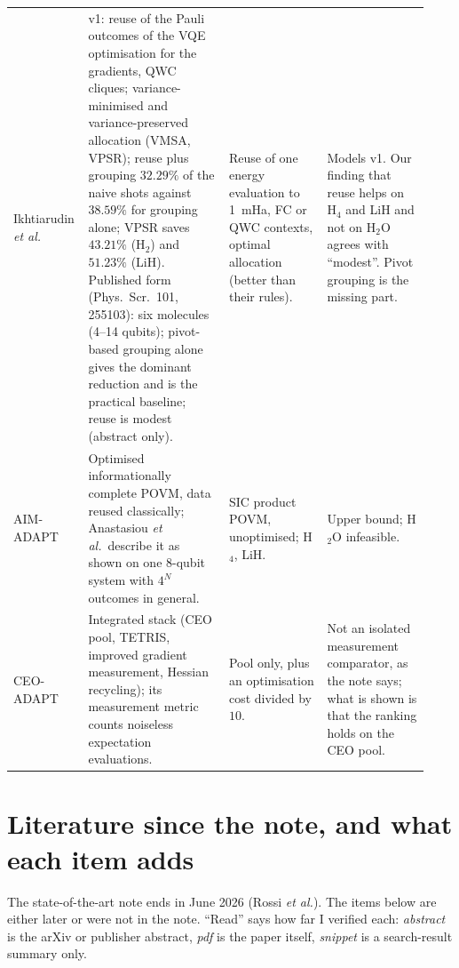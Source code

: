 \documentclass[11pt]{article}
\newcommand{\Hfour}{H$_4$}
\newcommand{\Htwo}{H$_2$O}
\begin{document}
\begin{longtable}{>{\raggedright\arraybackslash}p{0.13\linewidth}>{\raggedright\arraybackslash}p{0.33\linewidth}>{\raggedright\arraybackslash}p{0.23\linewidth}>{\raggedright\arraybackslash}p{0.24\linewidth}}
Ikhtiarudin \emph{et al.} & v1: reuse of the Pauli outcomes of the VQE optimisation for the gradients, QWC cliques; variance-minimised and variance-preserved allocation (VMSA, VPSR); reuse plus grouping $32.29\%$ of the naive shots against $38.59\%$ for grouping alone; VPSR saves $43.21\%$ (H$_2$) and $51.23\%$ (LiH). Published form (Phys.\ Scr.\ 101, 255103): six molecules (4--14 qubits); pivot-based grouping alone gives the dominant reduction and is the practical baseline; reuse is modest (abstract only). & Reuse of one energy evaluation to 1~mHa, FC or QWC contexts, optimal allocation (better than their rules). & Models v1. Our finding that reuse helps on \Hfour{} and LiH and not on \Htwo{} agrees with ``modest''. Pivot grouping is the missing part. \\
AIM-ADAPT & Optimised informationally complete POVM, data reused classically; Anastasiou \emph{et al.}\ describe it as shown on one 8-qubit system with $4^N$ outcomes in general. & SIC product POVM, unoptimised; \Hfour{}, LiH. & Upper bound; \Htwo{} infeasible. \\
CEO-ADAPT & Integrated stack (CEO pool, TETRIS, improved gradient measurement, Hessian recycling); its measurement metric counts noiseless expectation evaluations. & Pool only, plus an optimisation cost divided by $10$. & Not an isolated measurement comparator, as the note says; what is shown is that the ranking holds on the CEO pool. \\
\bottomrule
\end{longtable}
\endgroup

\section{Literature since the note, and what each item adds}
\label{sec:lit}

The state-of-the-art note ends in June 2026 (Rossi \emph{et al.}). The items below are either later or were not in the note. ``Read'' says how far I verified each: \emph{abstract} is the arXiv or publisher abstract, \emph{pdf} is the paper itself, \emph{snippet} is a search-result summary only.
\end{document}

